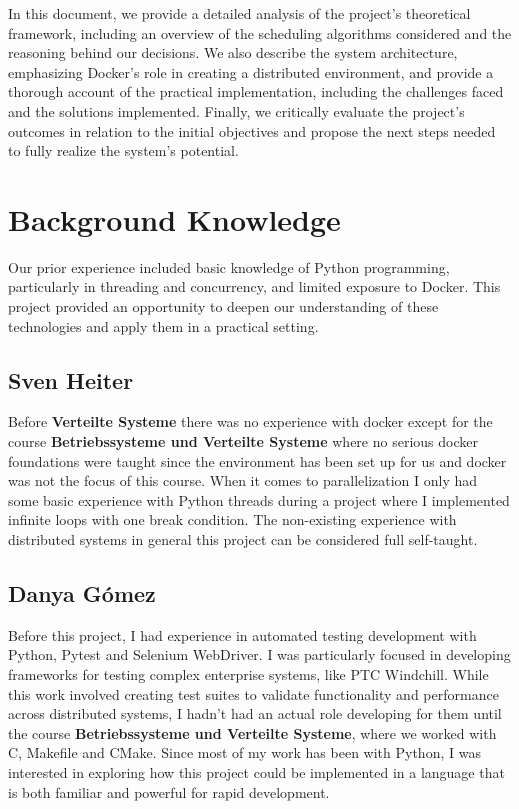 \documentclass{article}
\begin{document}
In this document, we provide a detailed analysis of the project's theoretical framework, including an overview of the scheduling algorithms considered and the reasoning behind our decisions. We also describe the system architecture, emphasizing Docker's role in creating a distributed environment, and provide a thorough account of the practical implementation, including the challenges faced and the solutions implemented. Finally, we critically evaluate the project's outcomes in relation to the initial objectives and propose the next steps needed to fully realize the system's potential.

\section{Background Knowledge}
Our prior experience included basic knowledge of Python programming, particularly in threading and concurrency, and limited exposure to Docker. This project provided an opportunity to deepen our understanding of these technologies and apply them in a practical setting.

\subsection{Sven Heiter}
Before \textbf{Verteilte Systeme} there was no experience with docker except for the course \textbf{Betriebssysteme und Verteilte Systeme} where no serious docker foundations were taught since the environment has been set up for us and docker was not the focus of this course. When it comes to parallelization I only had some basic experience with Python threads during a project where I implemented infinite loops with one break condition. The non-existing experience with distributed systems in general this project can be considered full self-taught.

\subsection{Danya Gómez}
Before this project, I had experience in automated testing development with Python, Pytest and Selenium WebDriver. I was particularly focused in developing frameworks for testing complex enterprise systems, like PTC Windchill. While this work involved creating test suites to validate functionality and performance across distributed systems, I hadn't had an actual role developing for them until the course \textbf{Betriebssysteme und Verteilte Systeme}, where we worked with C, Makefile and CMake. Since most of my work has been with Python, I was interested in exploring how this project could be implemented in a language that is both familiar and powerful for rapid development.
\end{document}
